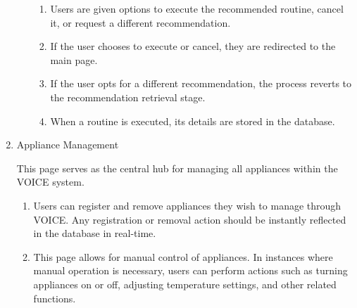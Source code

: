 \documentclass[conference]{IEEEtran}
\begin{document}
\begin{enumerate}[label=\arabic*]
\begin{enumerate}[label=\arabic*)]
        \begin{enumerate}[label=\alph*)]
            \item Users are given options to execute the recommended routine, cancel it, or request a different recommendation.

            \vspace{0.5em}

            \item If the user chooses to execute or cancel, they are redirected to the main page. 

            \vspace{0.5em}

            \item If the user opts for a different recommendation, the process reverts to the recommendation retrieval stage.

            \vspace{0.5em}

            \item When a routine is executed, its details are stored in the database.
        \end{enumerate}
    \end{enumerate}

    \vspace{1em}

    \item Appliance Management\par
    \vspace{0.3em}
    This page serves as the central hub for managing all appliances within the VOICE system.
    \vspace{0.3em}

    \begin{enumerate}[label=\arabic*)]
        \item Users can register and remove appliances they wish to manage through VOICE. Any registration or removal action should be instantly reflected in the database in real-time.

        \vspace{0.5em}

        \item This page allows for manual control of appliances. In instances where manual operation is necessary, users can perform actions such as turning appliances on or off, adjusting temperature settings, and other related functions.
    \end{enumerate}


\end{enumerate}
\end{document}
